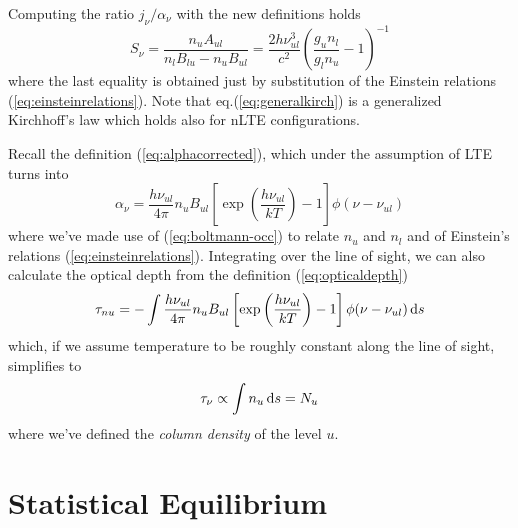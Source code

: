 \par Computing the ratio $j_{\nu}/\alpha_{\nu}$ with the new definitions holds
\begin{equation}
    S_{\nu} = \frac{n_{u}A_{ul}}{n_{l}B_{lu}-n_{u}B_{ul}} = \frac{2h\nu^{3}_{ul}}{c^{2}}\left(\frac{g_{u}n_{l}}{g_{l}n_{u}}-1\right)^{-1}
    \label{eq:generalkirch}
\end{equation}
where the last equality is obtained just by substitution of the Einstein relations (\ref{eq:einsteinrelations}). Note that eq.(\ref{eq:generalkirch}) is a generalized Kirchhoff's law which holds also for nLTE configurations.
\par Recall the definition (\ref{eq:alphacorrected}), which under the assumption of LTE turns into 
\begin{equation*}
    \alpha_{\nu} = \frac{h\nu_{ul}}{4\pi}n_{u}B_{ul}\left[\exp\left(\frac{h\nu_{ul}}{kT}\right)-1\right]\phi(\nu-\nu_{ul})
\end{equation*}
where we've made use of (\ref{eq:boltmann-occ}) to relate $n_{u}$ and $n_{l}$ and of Einstein's relations (\ref{eq:einsteinrelations}). Integrating over the line of sight, we can also calculate the optical depth from the definition (\ref{eq:opticaldepth})
\begin{equation}
    \tau_{nu} = - \int \frac{h\nu_{ul}}{4\pi}n_{u}B_{ul}\left[\exp\left(\frac{h\nu_{ul}}{kT}\right)-1\right]\phi(\nu-\nu_{ul})\,\text{d}s
\end{equation}
which, if we assume temperature to be roughly constant along the line of sight, simplifies to 
\begin{equation}
    \tau_{\nu} \propto \int n_{u}\,\text{d}s = N_{u}
\end{equation}
where we've defined the \emph{column density} of the level $u$.

\section{Statistical Equilibrium}


